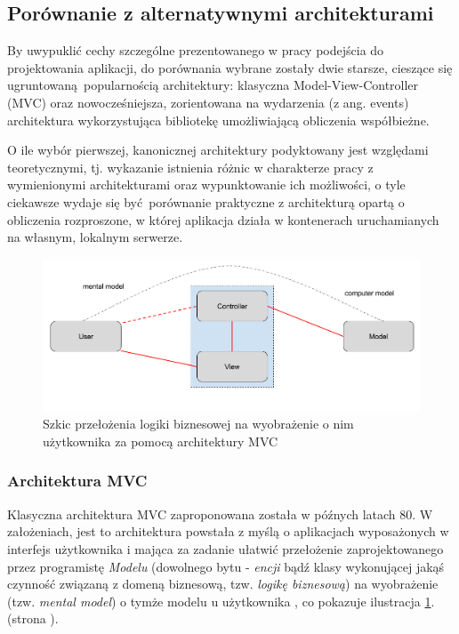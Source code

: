 \documentclass[oneside]{mgr}
\begin{document}
\subsection{Porównanie z alternatywnymi architekturami}
By uwypuklić cechy szczególne prezentowanego w pracy podejścia do projektowania aplikacji, do porównania wybrane zostały dwie starsze, cieszące się ugruntowaną popularnością architektury: klasyczna Model-View-Controller (MVC) oraz nowocześniejsza, zorientowana na wydarzenia (z ang. events) architektura wykorzystująca bibliotekę umożliwiającą obliczenia współbieżne.

O ile wybór pierwszej, kanonicznej architektury podyktowany jest względami teoretycznymi, tj. wykazanie istnienia różnic w charakterze pracy z wymienionymi architekturami oraz wypunktowanie ich możliwości, o tyle ciekawsze wydaje się być porównanie praktyczne z architekturą opartą o obliczenia rozproszone, w której aplikacja działa w kontenerach uruchamianych na własnym, lokalnym serwerze.

\begin{figure}
	\centering
	\includegraphics[width=15cm]{artima-mvcu}
	\caption{Szkic przełożenia logiki biznesowej na wyobrażenie o nim użytkownika za pomocą architektury MVC  \cite{artimaDciArchitecture}}
	\label{fig:mentalModelMvc}
\end{figure}

\subsubsection{Architektura MVC}
Klasyczna architektura MVC zaproponowana została w późnych latach 80. W założeniach, jest to architektura powstała z myślą o aplikacjach wyposażonych w interfejs użytkownika i mająca za zadanie ułatwić przełożenie zaprojektowanego przez programistę \textit{Modelu} (dowolnego bytu - \textit{encji} bądź klasy wykonującej jakąś czynność związaną z domeną biznesową, tzw. \textit{logikę biznesową}) na wyobrażenie (tzw. \textit{mental model}) o tymże modelu u użytkownika \cite{artimaDciArchitecture}, co pokazuje ilustracja \ref{fig:mentalModelMvc}. (strona \pageref{fig:mentalModelMvc}).
\end{document}
